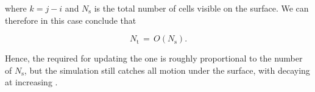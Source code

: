 where $k = j-i$ and $N_{\text{s}}$ is the total number of cells visible on the surface. We can therefore in this case conclude that

\begin{equation} \label{eq:number_of_cells_total_ordo}
N_{\text{t}} \,=\, O(N_{\text{s}}).
\end{equation}

Hence, the  required for updating the  one  is roughly proportional to the number of  $N_{\text{s}}$, but the simulation still catches all motion under the surface, with decaying \accuracy at increasing .





